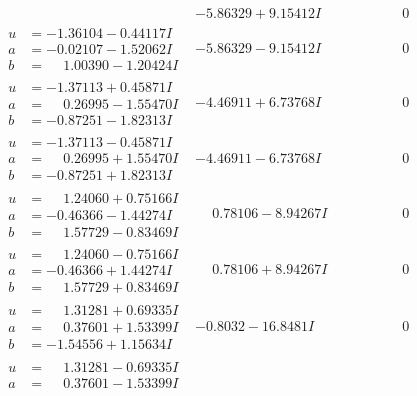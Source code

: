 \documentclass[1p]{elsarticle_modified}
\theoremstyle{definition}
\begin{document}
$$\begin{array}{c|c|c}
 & -5.86329 + 9.15412 I & \phantom{-0.000000 } 0 \\ \hline\begin{aligned}
u &= -1.36104 - 0.44117 I \\
a &= -0.02107 - 1.52062 I \\
b &= \phantom{-}1.00390 - 1.20424 I\end{aligned}
 & -5.86329 - 9.15412 I & \phantom{-0.000000 } 0 \\ \hline\begin{aligned}
u &= -1.37113 + 0.45871 I \\
a &= \phantom{-}0.26995 - 1.55470 I \\
b &= -0.87251 - 1.82313 I\end{aligned}
 & -4.46911 + 6.73768 I & \phantom{-0.000000 } 0 \\ \hline\begin{aligned}
u &= -1.37113 - 0.45871 I \\
a &= \phantom{-}0.26995 + 1.55470 I \\
b &= -0.87251 + 1.82313 I\end{aligned}
 & -4.46911 - 6.73768 I & \phantom{-0.000000 } 0 \\ \hline\begin{aligned}
u &= \phantom{-}1.24060 + 0.75166 I \\
a &= -0.46366 - 1.44274 I \\
b &= \phantom{-}1.57729 - 0.83469 I\end{aligned}
 & \phantom{-}0.78106 - 8.94267 I & \phantom{-0.000000 } 0 \\ \hline\begin{aligned}
u &= \phantom{-}1.24060 - 0.75166 I \\
a &= -0.46366 + 1.44274 I \\
b &= \phantom{-}1.57729 + 0.83469 I\end{aligned}
 & \phantom{-}0.78106 + 8.94267 I & \phantom{-0.000000 } 0 \\ \hline\begin{aligned}
u &= \phantom{-}1.31281 + 0.69335 I \\
a &= \phantom{-}0.37601 + 1.53399 I \\
b &= -1.54556 + 1.15634 I\end{aligned}
 & -0.8032 - 16.8481 I & \phantom{-0.000000 } 0 \\ \hline\begin{aligned}
u &= \phantom{-}1.31281 - 0.69335 I \\
a &= \phantom{-}0.37601 - 1.53399 I \\

\end{aligned}
\end{array}$$
\end{document}
